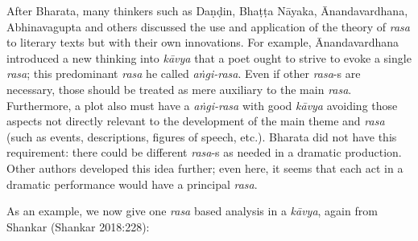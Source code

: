 After Bharata, many thinkers such as Daṇḍin, Bhaṭṭa Nāyaka, Ānandavardhana, Abhinavagupta and others discussed the use and application of the theory of \textsl{rasa} to literary texts but with their own innovations. For example, Ānandavardhana introduced a new thinking into \textsl{kāvya}
 that a poet ought to strive to evoke a single \textsl{rasa}; this predominant \textsl{rasa} he called \textsl{aṅgi-rasa}. Even if other \textsl{rasa}-s are necessary, those should be treated as mere auxiliary to the main \textsl{rasa}. Furthermore, a plot also must have a \textsl{aṅgi-rasa} with good \textsl{kāvya} avoiding those aspects not directly relevant to the development of the main theme and \textsl{rasa} (such as events, descriptions, figures of speech, etc.). Bharata did not have this requirement: there could be different \textsl{rasa}-s as needed in a dramatic production. Other authors developed this idea further; even here, it seems that each act in a dramatic performance would have a principal \textsl{rasa}. 

As an example, we now give one \textsl{rasa} based analysis in a \textsl{kāvya}, again from Shankar (Shankar 2018:228):

